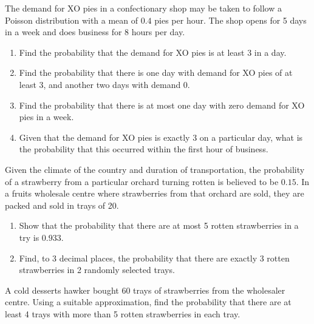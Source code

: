 \begin{problem}
    The demand for XO pies in a confectionary shop may be taken to follow a Poisson distribution with a mean of $0.4$ pies per hour. The shop opens for 5 days in a week and does business for 8 hours per day.

    \begin{enumerate}
        \item Find the probability that the demand for XO pies is at least 3 in a day.
        \item Find the probability that there is one day with demand for XO pies of at least 3, and another two days with demand 0.
        \item Find the probability that there is at most one day with zero demand for XO pies in a week.
        \item Given that the demand for XO pies is exactly 3 on a particular day, what is the probability that this occurred within the first hour of business.
    \end{enumerate}
\end{problem}

\begin{problem}
    Given the climate of the country and duration of transportation, the probability of a strawberry from a particular orchard turning rotten is believed to be $0.15$. In a fruits wholesale centre where strawberries from that orchard are sold, they are packed and sold in trays of 20.

    \begin{enumerate}
        \item Show that the probability that there are at most 5 rotten strawberries in a try is $0.933$.
        \item Find, to 3 decimal places, the probability that there are exactly 3 rotten strawberries in 2 randomly selected trays.
    \end{enumerate}
    
    A cold desserts hawker bought 60 trays of strawberries from the wholesaler centre. Using a suitable approximation, find the probability that there are at least 4 trays with more than 5 rotten strawberries in each tray.
\end{problem}